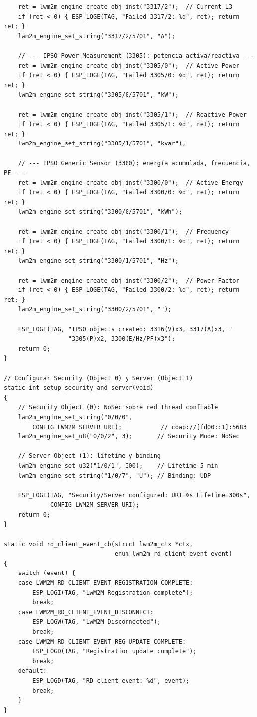 \begin{verbatim}
    ret = lwm2m_engine_create_obj_inst("3317/2");  // Current L3
    if (ret < 0) { ESP_LOGE(TAG, "Failed 3317/2: %d", ret); return ret; }
    lwm2m_engine_set_string("3317/2/5701", "A");

    // --- IPSO Power Measurement (3305): potencia activa/reactiva ---
    ret = lwm2m_engine_create_obj_inst("3305/0");  // Active Power
    if (ret < 0) { ESP_LOGE(TAG, "Failed 3305/0: %d", ret); return ret; }
    lwm2m_engine_set_string("3305/0/5701", "kW");

    ret = lwm2m_engine_create_obj_inst("3305/1");  // Reactive Power
    if (ret < 0) { ESP_LOGE(TAG, "Failed 3305/1: %d", ret); return ret; }
    lwm2m_engine_set_string("3305/1/5701", "kvar");

    // --- IPSO Generic Sensor (3300): energía acumulada, frecuencia, PF ---
    ret = lwm2m_engine_create_obj_inst("3300/0");  // Active Energy
    if (ret < 0) { ESP_LOGE(TAG, "Failed 3300/0: %d", ret); return ret; }
    lwm2m_engine_set_string("3300/0/5701", "kWh");

    ret = lwm2m_engine_create_obj_inst("3300/1");  // Frequency
    if (ret < 0) { ESP_LOGE(TAG, "Failed 3300/1: %d", ret); return ret; }
    lwm2m_engine_set_string("3300/1/5701", "Hz");

    ret = lwm2m_engine_create_obj_inst("3300/2");  // Power Factor
    if (ret < 0) { ESP_LOGE(TAG, "Failed 3300/2: %d", ret); return ret; }
    lwm2m_engine_set_string("3300/2/5701", "");

    ESP_LOGI(TAG, "IPSO objects created: 3316(V)x3, 3317(A)x3, "
                  "3305(P)x2, 3300(E/Hz/PF)x3");
    return 0;
}

// Configurar Security (Object 0) y Server (Object 1)
static int setup_security_and_server(void)
{
    // Security Object (0): NoSec sobre red Thread confiable
    lwm2m_engine_set_string("0/0/0",
        CONFIG_LWM2M_SERVER_URI);           // coap://[fd00::1]:5683
    lwm2m_engine_set_u8("0/0/2", 3);       // Security Mode: NoSec

    // Server Object (1): lifetime y binding
    lwm2m_engine_set_u32("1/0/1", 300);    // Lifetime 5 min
    lwm2m_engine_set_string("1/0/7", "U"); // Binding: UDP

    ESP_LOGI(TAG, "Security/Server configured: URI=%s Lifetime=300s",
             CONFIG_LWM2M_SERVER_URI);
    return 0;
}

static void rd_client_event_cb(struct lwm2m_ctx *ctx,
                               enum lwm2m_rd_client_event event)
{
    switch (event) {
    case LWM2M_RD_CLIENT_EVENT_REGISTRATION_COMPLETE:
        ESP_LOGI(TAG, "LwM2M Registration complete");
        break;
    case LWM2M_RD_CLIENT_EVENT_DISCONNECT:
        ESP_LOGW(TAG, "LwM2M Disconnected");
        break;
    case LWM2M_RD_CLIENT_EVENT_REG_UPDATE_COMPLETE:
        ESP_LOGD(TAG, "Registration update complete");
        break;
    default:
        ESP_LOGD(TAG, "RD client event: %d", event);
        break;
    }
}


\end{verbatim}
